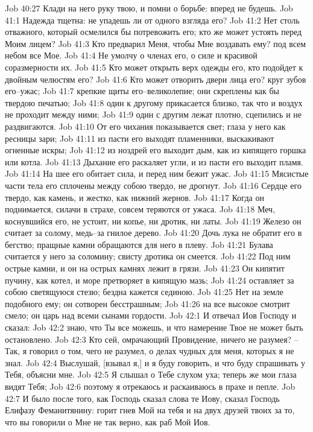 Job 40:27  Клади на него руку твою, и помни о борьбе: вперед не будешь.
Job 41:1  Надежда тщетна: не упадешь ли от одного взгляда его?
Job 41:2  Нет столь отважного, который осмелился бы потревожить его; кто же может устоять перед Моим лицем?
Job 41:3  Кто предварил Меня, чтобы Мне воздавать ему? под всем небом все Мое.
Job 41:4  Не умолчу о членах его, о силе и красивой соразмерности их.
Job 41:5  Кто может открыть верх одежды его, кто подойдет к двойным челюстям его?
Job 41:6  Кто может отворить двери лица его? круг зубов его--ужас;
Job 41:7  крепкие щиты его--великолепие; они скреплены как бы твердою печатью;
Job 41:8  один к другому прикасается близко, так что и воздух не проходит между ними;
Job 41:9  один с другим лежат плотно, сцепились и не раздвигаются.
Job 41:10  От его чихания показывается свет; глаза у него как ресницы зари;
Job 41:11  из пасти его выходят пламенники, выскакивают огненные искры;
Job 41:12  из ноздрей его выходит дым, как из кипящего горшка или котла.
Job 41:13  Дыхание его раскаляет угли, и из пасти его выходит пламя.
Job 41:14  На шее его обитает сила, и перед ним бежит ужас.
Job 41:15  Мясистые части тела его сплочены между собою твердо, не дрогнут.
Job 41:16  Сердце его твердо, как камень, и жестко, как нижний жернов.
Job 41:17  Когда он поднимается, силачи в страхе, совсем теряются от ужаса.
Job 41:18  Меч, коснувшийся его, не устоит, ни копье, ни дротик, ни латы.
Job 41:19  Железо он считает за солому, медь--за гнилое дерево.
Job 41:20  Дочь лука не обратит его в бегство; пращные камни обращаются для него в плеву.
Job 41:21  Булава считается у него за соломину; свисту дротика он смеется.
Job 41:22  Под ним острые камни, и он на острых камнях лежит в грязи.
Job 41:23  Он кипятит пучину, как котел, и море претворяет в кипящую мазь;
Job 41:24  оставляет за собою светящуюся стезю; бездна кажется сединою.
Job 41:25  Нет на земле подобного ему; он сотворен бесстрашным;
Job 41:26  на все высокое смотрит смело; он царь над всеми сынами гордости.
Job 42:1  И отвечал Иов Господу и сказал:
Job 42:2  знаю, что Ты все можешь, и что намерение Твое не может быть остановлено.
Job 42:3  Кто сей, омрачающий Провидение, ничего не разумея? --Так, я говорил о том, чего не разумел, о делах чудных для меня, которых я не знал.
Job 42:4  Выслушай, [взывал я,] и я буду говорить, и что буду спрашивать у Тебя, объясни мне.
Job 42:5  Я слышал о Тебе слухом уха; теперь же мои глаза видят Тебя;
Job 42:6  поэтому я отрекаюсь и раскаиваюсь в прахе и пепле.
Job 42:7  И было после того, как Господь сказал слова те Иову, сказал Господь Елифазу Феманитянину: горит гнев Мой на тебя и на двух друзей твоих за то, что вы говорили о Мне не так верно, как раб Мой Иов.
